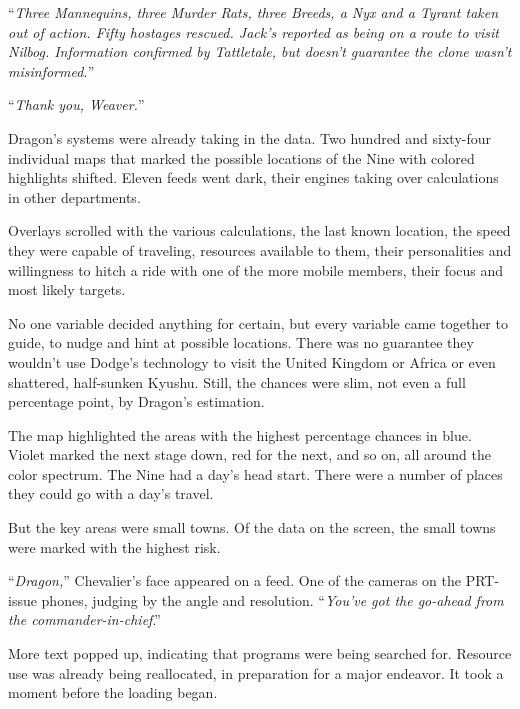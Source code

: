 





``\emph{Three Mannequins, three Murder Rats, three Breeds, a Nyx and a Tyrant taken out of action.  Fifty hostages rescued.  Jack's reported as being on a route to visit Nilbog.  Information confirmed by Tattletale, but doesn't guarantee the clone wasn't misinformed.}''



``\emph{Thank you, Weaver.}''



Dragon's systems were already taking in the data.  Two hundred and sixty-four individual maps that marked the possible locations of the Nine with colored highlights shifted.  Eleven feeds went dark, their engines taking over calculations in other departments.



Overlays scrolled with the various calculations, the last known location, the speed they were capable of traveling, resources available to them, their personalities and willingness to hitch a ride with one of the more mobile members, their focus and most likely targets.



No one variable decided anything for certain, but every variable came together to guide, to nudge and hint at possible locations.  There was no guarantee they wouldn't use Dodge's technology to visit the United Kingdom or Africa or even shattered, half-sunken Kyushu.  Still, the chances were slim, not even a full percentage point, by Dragon's estimation.



The map highlighted the areas with the highest percentage chances in blue.  Violet marked the next stage down, red for the next, and so on, all around the color spectrum.  The Nine had a day's head start.  There were a number of places they could go with a day's travel.



But the key areas were small towns.  Of the data on the screen, the small towns were marked with the highest risk.



``\emph{Dragon,}'' Chevalier's face appeared on a feed.  One of the cameras on the PRT-issue phones, judging by the angle and resolution.  ``\emph{You've got the go-ahead from the commander-in-chief}.''



More text popped up, indicating that programs were being searched for.  Resource use was already being reallocated, in preparation for a major endeavor.  It took a moment before the loading began.



